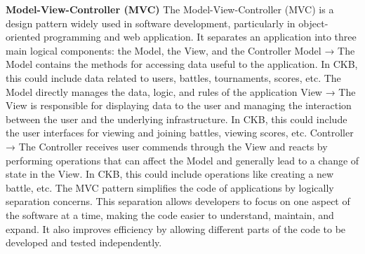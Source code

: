 \textbf{Model-View-Controller (MVC)}\newline
The Model-View-Controller (MVC) is a design pattern widely used in software development, particularly in object-oriented programming and web application. 
It separates an application into three main logical components: the Model, the View, and the Controller\newline
Model → The Model contains the methods for accessing data useful to the application. 
In CKB, this could include data related to users, battles, tournaments, scores, etc. The Model directly manages the data, logic, and rules of the application\newline
View → The View is responsible for displaying data to the user and managing the interaction between the user and the underlying infrastructure. 
In CKB, this could include the user interfaces for viewing and joining battles, viewing scores, etc.\newline
Controller → The Controller receives user commends through the View and reacts by performing operations that can affect the Model and 
generally lead to a change of state in the View. In CKB, this could include operations like creating a new battle, etc.\newline
The MVC pattern simplifies the code of applications by logically separation concerns. 
This separation allows developers to focus on one aspect of the software at a time, making the code easier to understand, maintain, and expand. 
It also improves efficiency by allowing different parts of the code to be developed and tested independently.

\textbf{}
